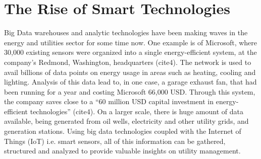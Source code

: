 \section{The Rise of Smart Technologies}
Big Data warehouses and analytic technologies have been making waves in the energy and utilities sector for some time now. One example is of Microsoft, where 30,000 existing sensors were organized into a single energy-efficient system, at the company's Redmond, Washington, headquarters (cite4). The network is used to avail billions of data points on energy usage in areas such as heating, cooling and lighting. Analysis of this data lead to, in one case, a garage exhaust fan, that had been running for a year and costing Microsoft 66,000 USD. Through this system, the company saves close to a ``60 million USD capital investment in energy-efficient technologies'' (cite4). On a larger scale, there is huge amount of data available, being generated from oil wells, electricity and other utility grids, and generation stations. Using big data technologies coupled with the Internet of Things (IoT) i.e. smart sensors, all of this information can be gathered, structured and analyzed to provide valuable insights on utility management.

